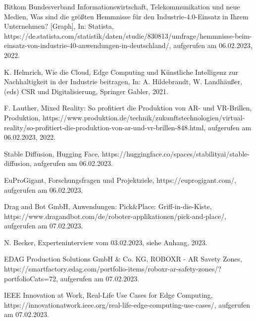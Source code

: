 \begin{thebibliography}{99}
	Bitkom Bundesverband Informationswirtschaft, Telekommunikation und neue Medien,
	Was sind die größten Hemmnisse für den Industrie-4.0-Einsatz in Ihrem Unternehmen? [Graph],
	In: Statista,
	https://de.statista.com/statistik/daten/studie/830813/umfrage/hemmnisse-beim-einsatz-von-industrie-40-anwendungen-in-deutschland/,
	aufgerufen am 06.02.2023,
	2022.

	K. Helmrich,
	Wie die Cloud, Edge Computing und Künstliche Intelligenz zur Nachhaltigkeit in der Industrie beitragen, 
	In: A. Hildebrandt, W. Landhäußer, (eds) CSR und Digitalisierung,
	Springer Gabler,
	2021.

	F. Lauther,
	Mixed Reality: So profitiert die Produktion von AR- und VR-Brillen,
	Produktion,
	https://www.produktion.de/technik/zukunftstechnologien/virtual-reality/so-profitiert-die-produktion-von-ar-und-vr-brillen-848.html,
	aufgerufen am 06.02.2023,
	2022.

	Stable Diffusion,
	Hugging Face,
	https://huggingface.co/spaces/stabilityai/stable-diffusion,
	aufgerufen am 06.02.2023.

	EuProGigant,
	Forschungsfragen und Projektziele,
	https://euprogigant.com/,
	aufgerufen am 06.02.2023.

	Drag and Bot GmbH,
	Anwendungen: Pick\&Place: Griff-in-die-Kiste,
	https://www.dragandbot.com/de/roboter-applikationen/pick-and-place/,
	aufgerufen am 07.02.2023.

	N. Becker,
	Experteninterview vom 03.02.2023,
	siehe Anhang,
	2023.

	EDAG Production Solutions GmbH \& Co. KG,
	ROBOXR - AR Savety Zones,
	https://smartfactory.edag.com/portfolio-items/roboxr-ar-safety-zones/?portfolioCats=72,
	aufgerufen am 07.02.2023.

	IEEE Innovation at Work,
	Real-Life Use Cases for Edge Computing,
	https://innovationatwork.ieee.org/real-life-edge-computing-use-cases/,
	aufgerufen am 07.02.2023.


\end{thebibliography}